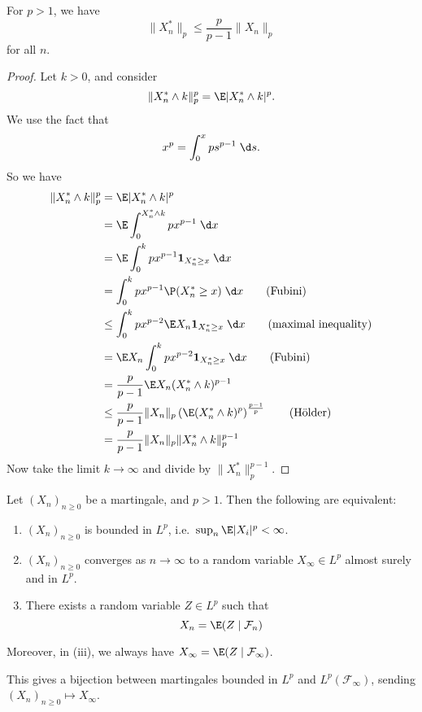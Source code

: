 \documentclass[a4paper]{article}
\begin{document}
\begin{lemma}
  For $p > 1$, we have
  \[
    \|X_n^*\|_p \leq \frac{p}{p - 1} \|X_n\|_p
  \]
  for all $n$.
\end{lemma}

\begin{proof}
  Let $k > 0$, and consider
  \[
    \|X_n^* \wedge k \|^p_p = \E |X_n^* \wedge k|^p.
  \]
  We use the fact that
  \[
    x^p = \int_0^x p s^{p - 1}\;\d s.
  \]
  So we have
  \begin{align*}
    \|X_n^* \wedge k\|^p_p &= \E|X_n^* \wedge k|^p\\
    &= \E \int_0^{X_n^* \wedge k} p x^{p - 1}\;\d x\\
    &= \E \int_0^k p x^{p - 1} \mathbf{1}_{X_n^* \geq x}\;\d x\\
    &= \int_0^k p x^{p - 1} \P(X_n^* \geq x)\;\d x\tag{Fubini}\\
    &\leq \int_0^k px^{p - 2} \E X_n \mathbf{1}_{X_n^* \geq x} \;\d x\tag{maximal inequality}\\
    &= \E X_n \int_0^k p x^{p - 2} \mathbf{1}_{X_n^* \geq x}\;\d x \tag{Fubini}\\
    &= \frac{p}{p - 1} \E X_n (X_n^* \wedge k) ^{p - 1}\\
    &\leq \frac{p}{p - 1} \|X_n\|_p \left(\E(X_n^* \wedge k)^p\right)^{\frac{p - 1}{p}}\tag{H\"older}\\
    &= \frac{p}{p - 1} \|X_n\|_p \|X_n^* \wedge k\|_p^{p - 1}
  \end{align*}
  Now take the limit $k \to \infty$ and divide by $\|X_n^*\|_p^{p - 1}$.
\end{proof}

\begin{thm}
  Let $(X_n)_{n \geq 0}$ be a martingale, and $p > 1$. Then the following are equivalent:
  \begin{enumerate}
    \item $(X_n)_{n \geq 0}$ is bounded in $L^p$, i.e.\ $\sup_n \E |X_i|^p < \infty$.
    \item $(X_n)_{n \geq 0}$ converges as $n \to \infty$ to a random variable $X_\infty \in L^p$ almost surely and in $L^p$.
    \item There exists a random variable $Z \in L^p$ such that
      \[
        X_n = \E (Z \mid \mathcal{F}_n)
      \]
  \end{enumerate}
  Moreover, in (iii), we always have $X_\infty = \E(Z \mid \mathcal{F}_\infty)$.
\end{thm}
This gives a bijection between martingales bounded in $L^p$ and $L^p(\mathcal{F}_\infty)$, sending $(X_n)_{n \geq 0} \mapsto X_\infty$.
\end{document}
